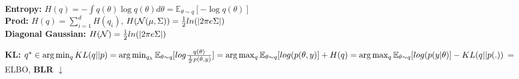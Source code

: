 \textbf{Entropy:} $H(q) = - \int q(\theta) \log q(\theta) d\theta = \mathbb{E}_{\theta \sim q} [-\log q(\theta)]$\\
\textbf{Prod:} $H(q) = \sum_{i=1}^d H(q_i)$, $H(\mathcal{N}(\mu, \Sigma)) = \frac{1}{2} ln(|2 \pi e \Sigma|)$\\
	\textbf{Diagonal Gaussian:} $H(\mathcal{N}) = \frac{1}{2} ln(|2 \pi e \Sigma|)$
\begin{comment}
 $= \frac{1}{2} ln(2\pi e) + \sum_i^d ln(\sigma_i)$\\
\end{comment}

\textbf{KL:} $q^* \in \arg \min_q KL(q||p) = \arg \min_{q_\lambda} \mathbb{E}_{\theta \sim q}[log \frac{q(\theta)}{\frac{1}{Z	} p(\theta, y)}]\\
= \arg \max_q \mathbb{E}_{\theta \sim q}[log(p(\theta, y)] + H(q)\\
= \arg \max_q \mathbb{E}_{\theta \sim q}[log(p(y|\theta)] - KL(q||p(.))$ = ELBO, \textbf{BLR} $\downarrow$\\

\begin{comment}
	Derivation: $q^* \in \arg \min_q KL(q||p) = \arg \min_q \mathbb{E}_{\theta \sim q}[log \frac{q(\theta)}{\frac{1}{Z	} p(\theta, y)}] \\
	= \arg \min_q \mathbb{E}_{\theta \sim q}[log (q(\theta)) + log(Z)- log(p(\theta, y)] \\
= \arg \min_q \mathbb{E}_{\theta \sim q}[- log(p(\theta, y)] + \mathbb{E} [log(Z)] - \mathbb{E} [-log (q(\theta))] \\
= \arg \max_q \mathbb{E}_{\theta \sim q}[log(p(\theta, y)] + H(q)\\
= \arg \max_q \mathbb{E}_{\theta \sim q}[log(p(y|\theta) + log(p(\theta)) - log(q(\theta))] \\
= \arg \max_q \mathbb{E}_{\theta \sim q}[log(p(y|\theta)] - KL(q||p(.))$\\\
\textbf{Note:} The KL at the bottom is directed at the prior, not the posterior anymore.\\
\textbf{Interpretation 1:} We want function q that maximizes the joint probabilty, but has high uncertainty where we don't have data.\\
\textbf{Interpretation 2:} We want to maximize the likelihood of the data, but stay as close to the prior as possible. It acts like a regulation term, otherwise we would get MLE.\\
In MLE we would optimize over d dimensions, if we have a diagonal Gaussian, the ELBO would optimise the means and variances, e.g. 2d dimensions.\\
\end{comment}

